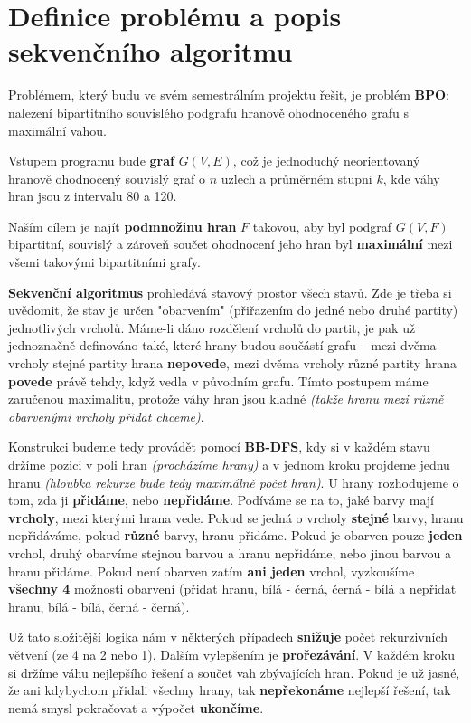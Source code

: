 \section{Definice problému a popis sekvenčního algoritmu}

Problémem, který budu ve svém semestrálním projektu řešit, je problém \textbf{BPO}: nalezení bipartitního souvislého podgrafu hranově ohodnoceného grafu s maximální vahou.

Vstupem programu bude \textbf{graf} $G(V,E)$, což je jednoduchý neorientovaný hranově ohodnocený souvislý graf o $n$ uzlech a průměrném stupni $k$, kde váhy hran jsou z intervalu 80 a 120.

Naším cílem je najít \textbf{podmnožinu hran} $F$ takovou, aby byl podgraf $G(V,F)$ bipartitní, souvislý a zároveň součet ohodnocení jeho hran byl \textbf{maximální} mezi všemi takovými bipartitními grafy.

\textbf{Sekvenční algoritmus} prohledává stavový prostor všech stavů. Zde je třeba si uvědomit, že stav je určen "obarvením" (přiřazením do jedné nebo druhé partity) jednotlivých vrcholů. Máme-li dáno rozdělení vrcholů do partit, je pak už jednoznačně definováno také, které hrany budou součástí grafu -- mezi dvěma vrcholy stejné partity hrana \textbf{nepovede}, mezi dvěma vrcholy různé partity hrana \textbf{povede} právě tehdy, když vedla v původním grafu. Tímto postupem máme zaručenou maximalitu, protože váhy hran jsou kladné \textit{(takže hranu mezi různě obarvenými vrcholy přidat chceme)}.

Konstrukci budeme tedy provádět pomocí \textbf{BB-DFS}, kdy si v každém stavu držíme pozici v poli hran \textit{(procházíme hrany)} a v jednom kroku projdeme jednu hranu \textit{(hloubka rekurze bude tedy maximálně počet hran)}. U hrany rozhodujeme o tom, zda ji \textbf{přidáme}, nebo \textbf{nepřidáme}. Podíváme se na to, jaké barvy mají \textbf{vrcholy}, mezi kterými hrana vede. Pokud se jedná o vrcholy \textbf{stejné} barvy, hranu nepřidáváme, pokud \textbf{různé} barvy, hranu přidáme. Pokud je obarven pouze \textbf{jeden} vrchol, druhý obarvíme stejnou barvou a hranu nepřidáme, nebo jinou barvou a hranu přidáme. Pokud není obarven zatím \textbf{ani jeden} vrchol, vyzkoušíme \textbf{všechny 4} možnosti obarvení (přidat hranu, bílá - černá, černá - bílá a nepřidat hranu, bílá - bílá, černá - černá).

Už tato složitější logika nám v některých případech \textbf{snižuje} počet rekurzivních větvení (ze 4 na 2 nebo 1). Dalším vylepšením je \textbf{prořezávání}. V každém kroku si držíme váhu nejlepšího řešení a součet vah zbývajících hran. Pokud je už jasné, že ani kdybychom přidali všechny hrany, tak \textbf{nepřekonáme} nejlepší řešení, tak nemá smysl pokračovat a výpočet \textbf{ukončíme}.

